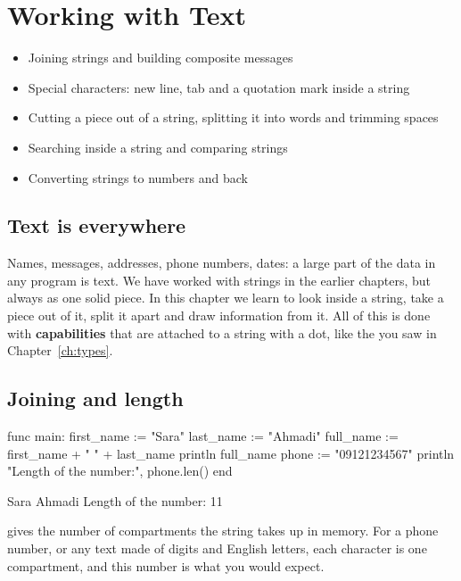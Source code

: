 \chapter{Working with Text}\label{ch:strings}

\begin{goals}
\begin{itemize}
  \item Joining strings and building composite messages
  \item Special characters: new line, tab and a quotation mark inside a string
  \item Cutting a piece out of a string, splitting it into words and trimming spaces
  \item Searching inside a string and comparing strings
  \item Converting strings to numbers and back
\end{itemize}
\end{goals}

\section{Text is everywhere}

Names, messages, addresses, phone numbers, dates: a large part of the data
in any program is text. We have worked with strings in the earlier chapters,
but always as one solid piece. In this chapter we learn to look inside a
string, take a piece out of it, split it apart and draw information from
it. All of this is done with \textbf{capabilities} that are attached to a
string with a dot, like the  you saw in Chapter~\ref{ch:types}.

\section{Joining and length}

\begin{salamcode}
func main:
    first_name := "Sara"
    last_name := "Ahmadi"
    full_name := first_name + " " + last_name
    println full_name
    phone := "09121234567"
    println "Length of the number:", phone.len()
end
\end{salamcode}

\begin{salamout}
Sara Ahmadi
Length of the number: 11
\end{salamout}

 gives the number of compartments the string takes up in
memory. For a phone number, or any text made of digits and English letters,
each character is one compartment, and this number is what you would
expect.

